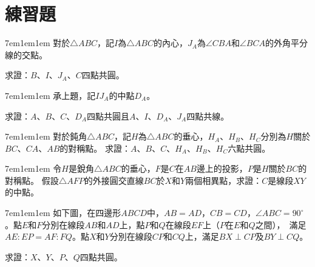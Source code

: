 \documentclass[12pt]{article}
\begin{document}
\section{練習題}
\begin{mybox}[Problem 1]{7em}{1em}{1em}
   對於$\triangle{ABC}$，記$I$為$\triangle{ABC}$的內心，$J_A$為$\angle{CBA}$和$\angle{BCA}$的外角平分線的交點。

   求證：$B$、$I$、$J_A$、$C$四點共圓。
\end{mybox}
\begin{mybox}[Problem 2]{7em}{1em}{1em}
   承上題，記$IJ_A$的中點$D_A$。
   
   求證：$A$、$B$、$C$、$D_A$四點共圓且$A$、$I$、$D_A$、$J_A$四點共線。
\end{mybox}
\begin{mybox}[Problem 3]{7em}{1em}{1em}
    對於鈍角$\triangle{ABC}$，記$H$為$\triangle{ABC}$的垂心，$H_A$、$H_B$、$H_C$分別為$H$關於$BC$、$CA$、$AB$的對稱點。
    求證：$A$、$B$、$C$、$H_A$、$H_B$、$H_C$六點共圓。
\end{mybox}
\begin{mybox}[Problem 4*]{7em}{1em}{1em}
    令$H$是銳角$\triangle{ABC}$的垂心，$F$是$C$在$AB$邊上的投影，$P$是$H$關於$BC$的對稱點。
    假設$\triangle{AFP}$的外接圓交直線$BC$於$X$和$Y$兩個相異點，求證：$C$是線段$XY$的中點。
\end{mybox}
\begin{mybox}[Problem 5*]{7em}{1em}{1em}
   如下圖，在四邊形$ABCD$中，$AB=AD$，$CB=CD$，$\angle{ABC}=90^\circ$。點$E$和$F$分別在線段$AB$和$AD$上，點$P$和$Q$在線段$EF$上（$P$在$E$和$Q$之間），\
   滿足$AE:EP=AF:FQ$。點$X$和$Y$分別在線段$CP$和$CQ$上，滿足$BX\perp CP$及$BY\perp CQ$。
   
   求證：$X$、$Y$、$P$、$Q$四點共圓。 
   \begin{center}
   \end{center}
\end{mybox}
\end{document}
